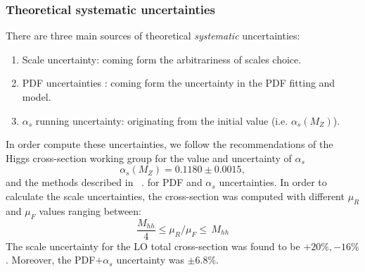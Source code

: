 \subsubsection{Theoretical systematic uncertainties}
There are three main sources of theoretical \textit{systematic} uncertainties:
\begin{enumerate}
	\item Scale uncertainty: coming form the arbitrariness of scales choice.
	\item PDF uncertainties : coming form the uncertainty in the PDF fitting and model.
	\item $\alpha_s$ running uncertainty: originating from the initial value (i.e. $\alpha_s(M_Z) $).
\end{enumerate}
In order compute these uncertainties, we follow the recommendations of the Higgs cross-section working group for the value and uncertainty of $\alpha_s$
\begin{equation}
	\alpha_s(M_Z) = 0.1180 \pm 0.0015,
\end{equation}
and the methods described in ~\cite{Martin:2009bu, Demartin:2010er}. for PDF and $\alpha_s$ uncertainties.
In order to calculate the scale uncertainties, the cross-section was computed with different $ \mu_R$ and $\mu_F$ values ranging between:
\begin{equation}
	\frac{M_{hh}}{4} \leq \mu_R/\mu_F  \leq \,M_{hh}
\end{equation}
The scale uncertainty for the LO total cross-section was found to be $+20\%, -16 \%$. Moreover, the PDF$+\alpha_s$ uncertainty was $\pm 6.8\%$.
